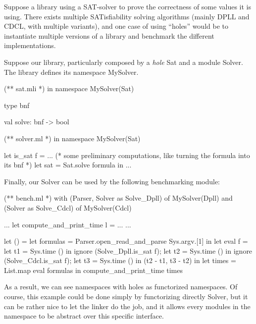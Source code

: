 \documentclass[11pt,a4paper]{article}
\begin{document}
Suppose a library using a SAT-solver to prove the correctness of some values it
is using. There exists multiple SATisfiability solving algorithms (mainly DPLL
and CDCL, with multiple variants), and one case of using ``holes'' would be to
instantiate multiple versions of a library and benchmark the different
implementations.

Suppose our library, particularly composed by a \emph{hole} Sat and a module
Solver. The library defines its namespace MySolver.

\begin{OCaml}
(** sat.mli *)
in namespace MySolver(Sat)

type bnf

val solve: bnf -> bool
\end{OCaml}

\medskip 

\begin{OCaml}
(** solver.ml *)
in namespace MySolver(Sat)

let is_sat f =
... 
(* some preliminary computations, like turning the formula into its bnf *)
  let sat = Sat.solve formula in 
...
\end{OCaml}

\medskip

Finally, our Solver can be used by the following benchmarking module:

\begin{OCaml}
(** bench.ml *)
with (Parser, Solver as Solve_Dpll) of MySolver(Dpll)
and (Solver as Solve_Cdcl) of MySolver(Cdcl)

...
let compute_and_print_time l = ...
...

let () =
  let formulas = 
    Parser.open_read_and_parse Sys.argv.[1] in
  let eval f =
    let t1 = Sys.time () in
    ignore (Solve_Dpll.is_sat f);
    let t2 = Sys.time () in
    ignore (Solve_Cdcl.is_sat f);
    let t3 = Sys.time () in
    (t2 - t1, t3 - t2)
  in
  let times = List.map eval formulas in
  compute_and_print_time times
\end{OCaml}

\medskip

As a result, we can see namespaces with holes as functorized namespaces. Of
course, this example could be done simply by functorizing directly Solver, but
it can be rather nice to let the linker do the job, and it allows every modules
in the namespace to be abstract over this specific interface.

\end{document}
